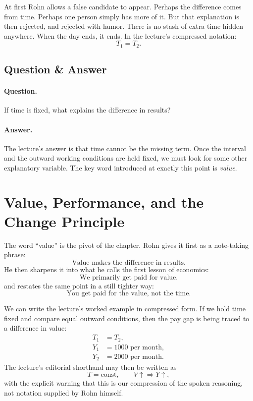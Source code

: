 At first Rohn allows a false candidate to appear. Perhaps the difference comes from time. Perhaps one person simply has more of it. But that explanation is then rejected, and rejected with humor. There is no stash of extra time hidden anywhere. When the day ends, it ends. In the lecture's compressed notation:
\begin{equation}
T_1 = T_2.
\end{equation}

\subsection{Question \& Answer}

\paragraph{Question.} If time is fixed, what explains the difference in results?

\paragraph{Answer.} The lecture's answer is that time cannot be the missing term. Once the interval and the outward working conditions are held fixed, we must look for some other explanatory variable. The key word introduced at exactly this point is \emph{value}.

\section{Value, Performance, and the Change Principle}

The word ``value'' is the pivot of the chapter. Rohn gives it first as a note-taking phrase:
\begin{equation}
\text{Value makes the difference in results.}
\end{equation}
He then sharpens it into what he calls the first lesson of economics:
\begin{equation}
\text{We primarily get paid for value.}
\end{equation}
and restates the same point in a still tighter way:
\begin{equation}
\text{You get paid for the value, not the time.}
\end{equation}

We can write the lecture's worked example in compressed form. If we hold time fixed and compare equal outward conditions, then the pay gap is being traced to a difference in value:
\begin{align}
T_1 &= T_2,\\
Y_1 &= 1000 \text{ per month},\\
Y_2 &= 2000 \text{ per month}.
\end{align}
The lecture's editorial shorthand may then be written as
\begin{equation}
T=\text{const},\qquad V\uparrow \Rightarrow Y\uparrow,
\end{equation}
with the explicit warning that this is our compression of the spoken reasoning, not notation supplied by Rohn himself.


